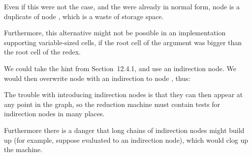 \begin{numbered}
    \phantom{XX} Even if this were not the case, and the  were already in normal
    form, node \ml{\$} is a duplicate of node \ml{\#}, which is a waste of storage space.

    \phantom{XX} Furthermore, this alternative might not be possible in an implementation supporting variable-sized cells, if the root cell of the argument was
    bigger than the root cell of the redex.

    \item We could take the hint from Section~12.4.1, and use an indirection node.
    We would then overwrite node \ml{\$} with an indirection to node \ml{\#}, thus:


    \noindent The trouble with introducing indirection nodes is that they can then
    appear at any point in the graph, so the reduction machine must contain
    tests for indirection nodes in many places.

    \phantom{XX} Furthermore there is a danger that long chains of indirection nodes
    might build up (for example, suppose  evaluated to an indirection
    node), which would clog up the machine.
\end{numbered}

